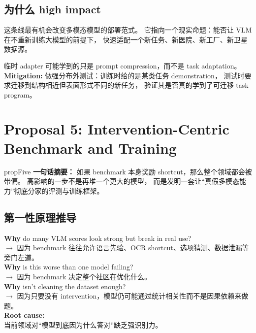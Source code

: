 \documentclass[12pt,a4paper]{article}
\begin{document}
\subsection{为什么 high impact}

这条线最有机会改变多模态模型的部署范式。
它指向一个现实命题：能否让 VLM 在不重新训练大模型的前提下，
快速适配一个新任务、新医院、新工厂、新卫星数据源。

\begin{riskbox}
临时 adapter 可能学到的只是 prompt compression，而不是 task adaptation。\\
\textbf{Mitigation:}
做强分布外测试：训练时给的是某类任务 demonstration，
测试时要求迁移到结构相近但表面形式不同的新任务，
验证其是否真的学到了可迁移 task program。
\end{riskbox}

\newpage
\section{Proposal 5: Intervention-Centric Benchmark and Training}

\begin{proposalbox}{propFive}
\textbf{一句话摘要：}
如果 benchmark 本身奖励 shortcut，那么整个领域都会被带偏。
高影响的一步不是再堆一个更大的模型，
而是发明一套让``真假多模态能力''彻底分家的评测与训练框架。
\end{proposalbox}

\subsection{第一性原理推导}

\begin{whybox}
\textbf{Why} do many VLM scores look strong but break in real use?\\
$\rightarrow$ 因为 benchmark 往往允许语言先验、OCR shortcut、选项猜测、数据泄漏等旁门左道。\\[3pt]
\textbf{Why} is this worse than one model failing?\\
$\rightarrow$ 因为 benchmark 决定整个社区在优化什么。\\[3pt]
\textbf{Why} isn't cleaning the dataset enough?\\
$\rightarrow$ 因为只要没有 intervention，模型仍可能通过统计相关性而不是因果依赖来做题。\\[3pt]
\textbf{Root cause:}\\
当前领域对``模型到底因为什么答对''缺乏强识别力。
\end{whybox}
\end{document}
